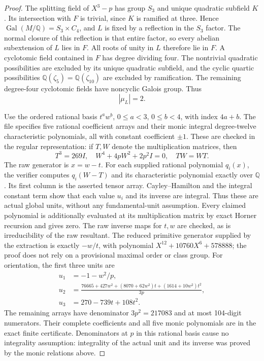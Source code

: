 \begin{proof}
The splitting field of $X^3-p$ has group $S_3$ and unique
quadratic subfield $K$.  Its intersection with $F$ is trivial,
since $K$ is ramified at three.  Hence
$\operatorname{Gal}(M/\mathbb Q)=S_3\times C_4$, and $L$ is
fixed by a reflection in the $S_3$ factor.  The normal closure
of this reflection is that entire factor, so every abelian
subextension of $L$ lies in $F$.  All roots of unity in $L$
therefore lie in $F$.  A cyclotomic field contained in $F$ has
degree dividing four.  The nontrivial quadratic possibilities
are excluded by its unique quadratic subfield, and the cyclic
quartic possibilities $\mathbb Q(\zeta_5)=\mathbb Q(\zeta_{10})$
are excluded by ramification.  The remaining degree-four
cyclotomic fields have noncyclic Galois group.  Thus
\[
                         |\mu_L|=2.
 \tag{C16R.6}
\]

Use the ordered rational basis $t^a w^b$, $0\le a<3$, $0\le b<4$,
with index $4a+b$.  The file
 specifies five
rational coefficient arrays and their monic integral degree-twelve
characteristic polynomials, all with constant coefficient $\pm1$.
These are checked in the regular representation: if $T,W$ denote
the multiplication matrices, then
\[
 T^3=269I,\quad W^4+4pW^2+2p^2I=0,\quad TW=WT.
 \tag{C16R.7}
\]
The raw generator is $x=w-t$.  For each supplied rational
polynomial $q_i(x)$, the verifier computes $q_i(W-T)$ and its
characteristic polynomial exactly over $\mathbb Q$.
Its first column is the asserted tensor array.  Cayley--Hamilton
and the integral constant term show that each value $u_i$ and
its inverse are integral.  Thus these are actual global units,
without any fundamental-unit assumption.
Every claimed polynomial is additionally evaluated at its multiplication
matrix by exact Horner recursion and gives zero.  The raw inverse
maps for $t,w$ are checked, as is irreducibility of the raw
resultant.  The reduced primitive generator supplied by the
extraction is exactly $-w/t$, with polynomial
$X^{12}+10760X^6+578888$; the proof does not rely on a provisional
maximal order or class group.
For orientation, the first three units are
\[
\begin{aligned}
 u_1&=-1-w^2/p,\\
 u_2&=\frac{76665+427w^2+(8070+62w^2)t+(1614+10w^2)t^2}{3p},\\
 u_3&=270-739t+108t^2.
\end{aligned}
 \tag{C16R.8}
\]
The remaining arrays have denominator $3p^2=217083$ and at most
104-digit numerators.  Their complete coefficients and all five
monic polynomials are in the exact finite certificate.  Denominators
at $p$ in this rational basis cause no integrality assumption:
integrality of the actual unit and its inverse was proved by the
monic relations above.


\end{proof}
